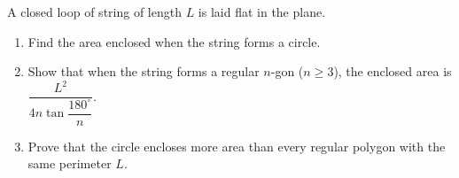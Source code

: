 A closed loop of string of length $L$ is laid flat in the plane.
\begin{enumerate}
\item[(a)] Find the area enclosed when the string forms a circle.
\item[(b)] Show that when the string forms a regular $n$-gon ($n\ge3$), the enclosed area is $\dfrac{L^2}{4n\tan\dfrac{180^\circ}{n}}$.
\item[(c)] Prove that the circle encloses more area than every regular polygon with the same perimeter $L$.
\end{enumerate}
